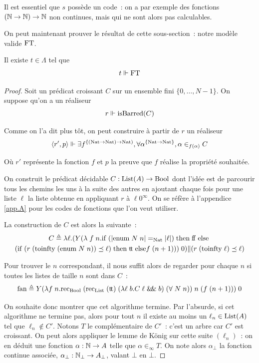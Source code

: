 \documentclass{article}
\begin{document}
\begin{rmk}
    Il est essentiel que $s$ possède un code~: on a par exemple des fonctions $(\mathbb{N}\to\mathbb{N}) \to \mathbb{N}$ non continues, mais qui ne sont alors pas calculables.
\end{rmk}

On peut maintenant prouver le résultat de cette sous-section~: notre modèle valide $\mathrm{FT}$.

\begin{them}\label{them.FT}
    Il existe $t \in \Lambda$ tel que
    \[t \Vdash \mathrm{FT}\]
\end{them}

\begin{proof}
    Soit un prédicat croissant $C$ sur un ensemble fini $\{0,\ldots,N-1\}$. On suppose qu'on a un réaliseur
    \[r \Vdash \mathrm{isBarred}(C)\]

    Comme on l'a dit plus tôt, on peut construire à partir de $r$ un réaliseur
    \[\langle r',p\rangle \Vdash \exists f^{\{(\mathrm{Nat}\to\mathrm{Nat})\to\mathrm{Nat})}, \forall \alpha^{\{\mathrm{Nat}\to\mathrm{Nat}\}}, \alpha\in_{f(\alpha)} C\]

    Où $r'$ représente la fonction $f$ et $p$ la preuve que $f$ réalise la propriété souhaitée.
    
    On construit le prédicat décidable $C : \mathrm{List}(A) \to \mathrm{Bool}$ dont l'idée est de parcourir tous les chemins les uns à la suite des autres en ajoutant chaque fois pour une liste $\ell$ la liste obtenue en appliquant $r$ à $\ell 0^\infty$. On se réfère à l'appendice \ref{app.A} pour les codes de fonctions que l'on veut utiliser.

    La construction de $C$ est alors la suivante~:
    \begin{multline*}
        C \triangleq \lambda \ell. (Y(\lambda\;f\;n.\mathrm{if}\;(|\mathrm{enum}\;N\;n| =_{\mathrm{Nat}} |\ell|)\;\mathrm{then}\;\mathrm{f}\!\mathrm{f} \;\mathrm{else}\;\\(\mathrm{if}\;(r\;(\mathrm{toinfty}\;(\mathrm{enum}\;N\;n))\preceq \ell)\;\mathrm{then}\;\mathrm{t}\!\mathrm{t}\;\mathrm{else}f\;(n+1)))\;0)\| (r\;(\mathrm{toinfty}\;\ell)\preceq\ell)
    \end{multline*}

    Pour trouver le $n$ correspondant, il nous suffit alors de regarder pour chaque $n$ si toutes les listes de taille $n$ sont dans $C$~:
    \[\mathrm{fan}\triangleq Y(\lambda f\; n. \mathrm{rec}_{\mathrm{Bool}}\;(\mathrm{rec}_{\mathrm{List}}\;(\mathrm{t}\!\mathrm{t})\;(\lambda \ell\;b.C\;\ell\;\&\!\&\;b)\;(\forall\;N\;n))\;n\;(f\;(n+1)))\;0\]

    On souhaite donc montrer que cet algorithme termine. Par l'absurde, si cet algorithme ne termine pas, alors pour tout $n$ il existe au moins un $\ell_n \in \mathrm{List}(A)$ tel que $\ell_n \notin C'$. Notons $T$ le complémentaire de $C'$~: c'est un arbre car $C'$ est croissant. On peut alors appliquer le lemme de König sur cette suite $(\ell_n)$~: on en déduit une fonction $\alpha : \mathbb{N} \to A$ telle que $\alpha \in_\infty T$. On note alors $\alpha_\bot$ la fonction continue associée, $\alpha_\bot : \mathbb{N}_\bot \to A_\bot$, valant $\bot$ en $\bot$.


\end{proof}
\end{document}
